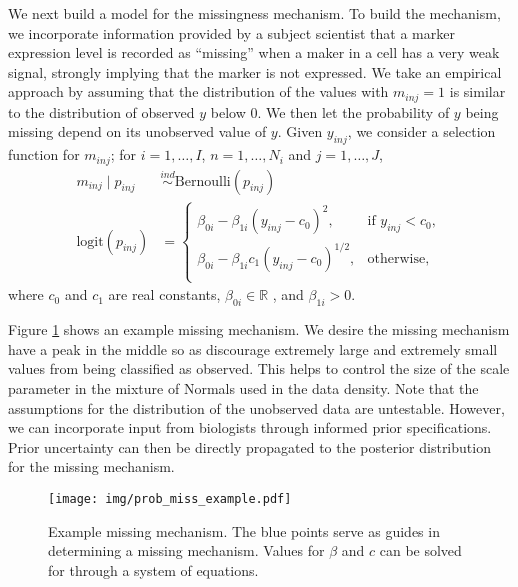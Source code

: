 \documentclass[12pt,]{article}
\newcommand{\p}[1]{\left(#1\right)}
\newcommand{\ind}{\overset{ind}{\sim}}
\def\logit{\text{logit}}
\def\Bern{\text{Bernoulli}}
\def\Prob{\text{Pr}}
\begin{document}
We next build a model for the missingness mechanism.  To build the mechanism,
we incorporate information provided by a subject scientist that a marker
expression level is recorded as ``missing'' when a maker in a cell has a very
weak signal, strongly implying that the marker is not expressed.  We take an
empirical approach by assuming that the distribution of the values with
$m_{inj}=1$ is similar to the distribution of observed $y$ below 0. We then let
the probability of $y$ being missing depend on its unobserved value of $y$.
%
Given
\(y_{inj}\), we consider a selection function for \(m_{inj}\); for
\(i=1, \ldots, I\), \(n=1, \ldots, N_i\) and \(j=1, \ldots, J\),
\begin{align}
  m_{inj} \mid p_{inj} &\ind \Bern(p_{inj}) \label{eq:missing} \\
  \logit(p_{inj}) &= \begin{cases}
  \beta_{0i} - \beta_{1i}(y_{inj}-c_0)^2, & \text{if } y_{inj} < c_0\nonumber, \\
  \beta_{0i} - \beta_{1i}c_1\p{y_{inj}-c_0}^{1/2}, & \text{otherwise}, \nonumber \\
  \end{cases} 
\end{align}
where \(c_0\) and \(c_1\) are real constants, $\beta_{0i} \in \mathbb{R}$ , and
$\beta_{1i} > 0$.

Figure \ref{fig:prob-miss-eg} shows an example missing mechanism. We desire the
missing mechanism have a peak in the middle so as discourage extremely large
and extremely small values from being classified as observed. This helps to
control the size of the scale parameter in the mixture of Normals used in the
data density. Note that the assumptions for the distribution of the unobserved
data are untestable. However, we can incorporate input from biologists through
informed prior specifications. Prior uncertainty can then be directly
propagated to the posterior distribution for the missing mechanism.

\begin{figure}[th!]
\begin{center}
\texttt{[image: img/prob\_miss\_example.pdf]}
\caption{Example missing mechanism. The blue points serve as guides in
determining a missing mechanism. Values for $\beta$ and $c$ can be solved for
through a system of equations.}
\label{fig:prob-miss-eg}
\end{center}
\end{figure}
\end{document}
